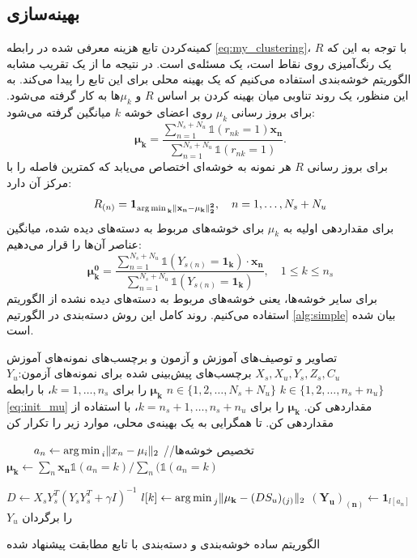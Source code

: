 \subsection{بهینه‌سازی}\label{simple_opt}
 کمینه‌کردن تابع هزینه معرفی شده در رابطه
\ref{eq:my_clustering}،
با توجه به این که $R$ یک رنگ‌آمیزی روی نقاط است، یک مسئله‌ی \nphard است. در نتیجه ما از یک تقریب
مشابه الگوریتم خوشه‌بندی  استفاده می‌کنیم که یک بهینه محلی برای این تابع را پیدا می‌کند. به این منظور،  یک روند تناوبی میان بهینه کردن بر اساس $R$ و $\mu_k$ها به کار گرفته می‌شود. برای بروز رسانی $\mu_k$ روی اعضای خوشه $k$ میانگین گرفته می‌شود:
\begin{equation} \label{eq:updata_mu}
 \boldsymbol{\mu_k} = \frac{\sum_{n=1}^{N_s + N_u}  \mathds{1}(r_{nk}=1)\mathbf{x_n}}{\sum_{n=1}^{N_s+N_u}\mathds{1}(r_{nk}=1)}.
\end{equation}
برای بروز رسانی $R$ هر نمونه به خوشه‌ای اختصاص می‌یابد که کمترین فاصله را با مرکز آن دارد:
\begin{equation} \label{eq:updata_R}
R_{(n)} = \mathbf{1_{\operatorname*{arg\,min\,}_k \left \lVert x_n - \mu_k \right \rVert_2^2}}, \quad n=1,\ldots,N_s+N_u
\end{equation}
برای مقداردهی اولیه به $\mu_k$ برای  خوشه‌های مربوط به دسته‌های دیده شده، میانگین عناصر آن‌ها را قرار می‌دهیم:
\begin{equation} \label{eq:init_mu}
 \boldsymbol{\mu_k^0} = \frac{\sum_{n=1}^{N_s + N_u}  \mathds{1}(Y_{s(n)} = \mathbf{1_k})\cdot \mathbf{x_n}}{\sum_{n=1}^{N_s+N_u}\mathds{1}(Y_{s(n)} = \mathbf{1_k})},
\quad 1 \leq k \leq n_s
\end{equation}
برای سایر خوشه‌ها، یعنی خوشه‌های مربوط به دسته‌های دیده نشده از الگوریتم
 \cite{kmeanspp}
استفاده می‌کنیم.
روند کامل این روش دسته‌بندی در الگورتیم
\ref{alg:simple}
بیان شده است.

	\begin{enumerate}[label={\arabic*},itemsep=.1em, parsep=.1em]
 تصاویر و توصیف‌های آموزش و آزمون و برچسب‌های نمونه‌های آموزش $X_s, X_u, Y_s, Z_s, C_u$
 برچسب‌های پیش‌بینی شده برای نمونه‌های آزمون:$Y_u$
   $k \in \{ 1,2, \ldots, n_s + n_u \}$
  $n \in \{ 1,2, \ldots, N_s + N_u \}$
  $\boldsymbol{\mu_k}$ را برای  $k=1,\ldots,n_s$،  با رابطه \eqref{eq:init_mu} مقداردهی کن.
  $\boldsymbol{\mu_k}$ را برای $k=n_s+1,\ldots,n_s+n_u$، با استفاده از  مقداردهی کن.
 تا همگرایی به یک بهینه‌ی محلی، موارد زیر را تکرار کن

 $\qquad$   $ a_n \leftarrow  {\operatorname*{arg\,min\,}_i \lVert x_n - \mu_i \rVert_2}$ //تخصیص خوشه‌ها
 $\qquad$ $\mathbf{\mu_k} \leftarrow \sum_{n} \mathbf{x_n} \mathds{1}(a_n = k) / \sum_n (\mathds{1}(a_n = k) $

  $  D \leftarrow X_s Y_s^T (Y_s Y_s^T + \gamma I)^{-1}$
  $l[k] \leftarrow \operatorname*{arg\,min\,}_j \lVert \mathbf{\mu_k} - (DS_u)_{(j)} \rVert_2$
   $\mathbf{(Y_u)_{(n)}} \leftarrow \mathbf{1}_{l[a_n]}$
 $Y_u$ را برگردان
\end{enumerate}
\caption{الگوریتم ساده خوشه‌بندی و دسته‌بندی با تابع مطابقت پیشنهاد شده}
\label{alg:simple}


